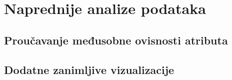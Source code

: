 \chapter{Naprednije analize podataka}

	\section{Proučavanje međusobne ovisnosti atributa}
	
	\section{Dodatne zanimljive vizualizacije}